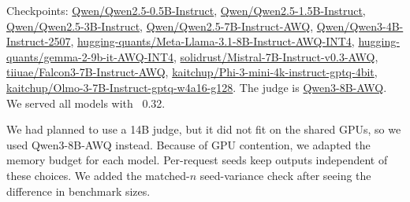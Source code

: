  Checkpoints: \url{Qwen/Qwen2.5-0.5B-Instruct}, \url{Qwen/Qwen2.5-1.5B-Instruct}, \url{Qwen/Qwen2.5-3B-Instruct}, \url{Qwen/Qwen2.5-7B-Instruct-AWQ}, \url{Qwen/Qwen3-4B-Instruct-2507}, \url{hugging-quants/Meta-Llama-3.1-8B-Instruct-AWQ-INT4}, \url{hugging-quants/gemma-2-9b-it-AWQ-INT4}, \url{solidrust/Mistral-7B-Instruct-v0.3-AWQ}, \url{tiiuae/Falcon3-7B-Instruct-AWQ}, \url{kaitchup/Phi-3-mini-4k-instruct-gptq-4bit}, \url{kaitchup/Olmo-3-7B-Instruct-gptq-w4a16-g128}. The judge is \url{Qwen3-8B-AWQ}. We served all models with \vllm~0.32.

 We had planned to use a 14B judge, but it did not fit on the shared GPUs, so we used Qwen3-8B-AWQ instead. Because of GPU contention, we adapted the memory budget for each model. Per-request seeds keep outputs independent of these choices. We added the matched-$n$ seed-variance check after seeing the difference in benchmark sizes.
